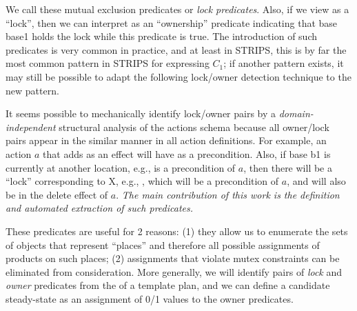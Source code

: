 %
We call these mutual exclusion predicates or {\em lock predicates}. %
Also, if we view  as a ``lock'', then we can interpret
 as an ``ownership'' predicate indicating that base base1
holds the lock while this predicate is true.
The introduction of such predicates is very common in practice, and at least in STRIPS, %
this is by far the most common pattern in STRIPS for expressing $C_1$; if another pattern exists, it may still be possible to adapt the following lock/owner detection technique to the new pattern.

It seems possible to mechanically identify lock/owner pairs by
a {\em domain-independent} structural analysis of the actions schema 
because all owner/lock pairs appear in the similar manner in all action definitions.
For example, an action $a$ that adds
 as an effect will have  as a
precondition. Also, if base b1 is currently at another location, e.g.,
 is a precondition of $a$, then there will be a ``lock''
corresponding to X, e.g., , which will be a precondition
of $a$, and will also be in the delete effect of $a$.
{\em The main contribution of this work is the definition and automated extraction of such predicates.}

These predicates are useful for 2 reasons: %
(1) they allow us to enumerate the sets of objects that represent ``places'' and
therefore all possible assignments of products on such places; 
(2) assignments that violate mutex constraints can be eliminated from consideration.
More generally, we will identify pairs of {\em lock} and {\em owner}
predicates from the \psteps of a template plan, and we can define a candidate steady-state as
an assignment of 0/1 values to the owner predicates.

